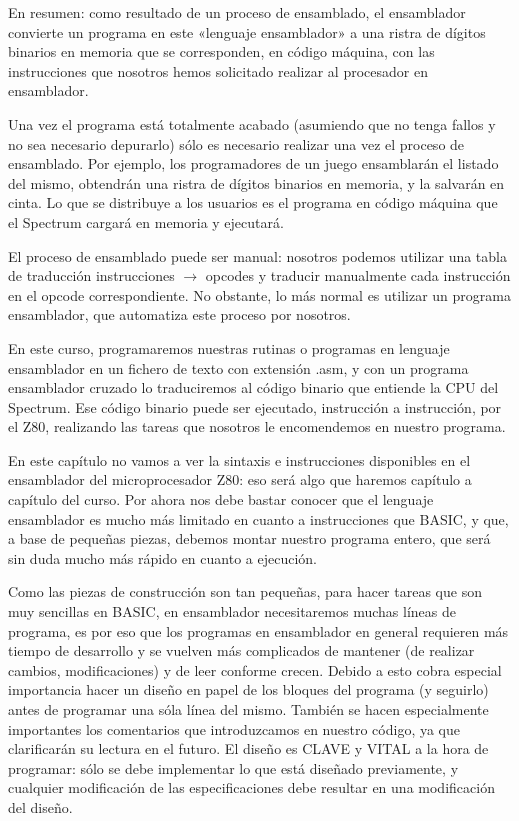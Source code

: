 \documentclass[letterpaper,10pt,spanish]{sphinxmanual}
\begin{document}
En resumen: como resultado de un proceso de ensamblado, el ensamblador convierte un programa en este «lenguaje ensamblador» a una ristra de dígitos binarios en memoria que se corresponden, en código máquina, con las instrucciones que nosotros hemos solicitado realizar al procesador en ensamblador.

Una vez el programa está totalmente acabado (asumiendo que no tenga fallos y no sea necesario depurarlo) sólo es necesario realizar una vez el proceso de ensamblado. Por ejemplo, los programadores de un juego ensamblarán el listado del mismo, obtendrán una ristra de dígitos binarios en memoria, y la salvarán en cinta. Lo que se distribuye a los usuarios es el programa en código máquina que el Spectrum cargará en memoria y ejecutará.

El proceso de ensamblado puede ser manual: nosotros podemos utilizar una tabla de traducción instrucciones \(\rightarrow\) opcodes y traducir manualmente cada instrucción en el opcode correspondiente. No obstante, lo más normal es utilizar un programa ensamblador, que automatiza este proceso por nosotros.

En este curso, programaremos nuestras rutinas o programas en lenguaje ensamblador en un fichero de texto con extensión .asm, y con un programa ensamblador cruzado lo traduciremos al código binario que entiende la CPU del Spectrum. Ese código binario puede ser ejecutado, instrucción a instrucción, por el Z80, realizando las tareas que nosotros le encomendemos en nuestro programa.

En este capítulo no vamos a ver la sintaxis e instrucciones disponibles en el ensamblador del microprocesador Z80: eso será algo que haremos capítulo a capítulo del curso. Por ahora nos debe bastar conocer que el lenguaje ensamblador es mucho más limitado en cuanto a instrucciones que BASIC, y que, a base de pequeñas piezas, debemos montar nuestro programa entero, que será sin duda mucho más rápido en cuanto a ejecución.

Como las piezas de construcción son tan pequeñas, para hacer tareas que son muy sencillas en BASIC, en ensamblador necesitaremos muchas líneas de programa, es por eso que los programas en ensamblador en general requieren más tiempo de desarrollo y se vuelven más complicados de mantener (de realizar cambios, modificaciones) y de leer conforme crecen. Debido a esto cobra especial importancia hacer un diseño en papel de los bloques del programa (y seguirlo) antes de programar una sóla línea del mismo. También se hacen especialmente importantes los comentarios que introduzcamos en nuestro código, ya que clarificarán su lectura en el futuro. El diseño es CLAVE y VITAL a la hora de programar: sólo se debe implementar lo que está diseñado previamente, y cualquier modificación de las especificaciones debe resultar en una modificación del diseño.
\end{document}
